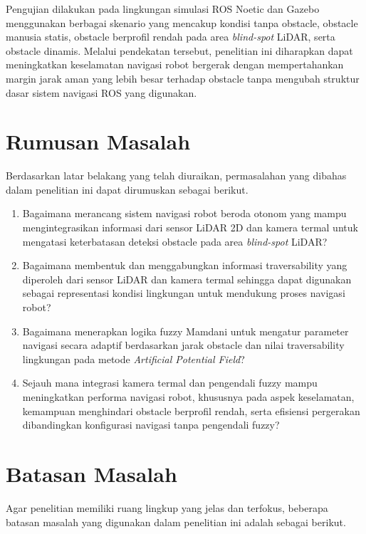 Pengujian dilakukan pada lingkungan simulasi ROS Noetic dan Gazebo menggunakan berbagai skenario yang mencakup kondisi tanpa obstacle, obstacle manusia statis, obstacle berprofil rendah pada area \textit{blind-spot} LiDAR, serta obstacle dinamis. Melalui pendekatan tersebut, penelitian ini diharapkan dapat meningkatkan keselamatan navigasi robot bergerak dengan mempertahankan margin jarak aman yang lebih besar terhadap obstacle tanpa mengubah struktur dasar sistem navigasi ROS yang digunakan.

\section{Rumusan Masalah}
\label{sec:Rumusan Masalah}

Berdasarkan latar belakang yang telah diuraikan, permasalahan yang dibahas dalam penelitian ini dapat dirumuskan sebagai berikut.

\begin{enumerate}
\item Bagaimana merancang sistem navigasi robot beroda otonom yang mampu mengintegrasikan informasi dari sensor LiDAR 2D dan kamera termal untuk mengatasi keterbatasan deteksi obstacle pada area \textit{blind-spot} LiDAR?
\item Bagaimana membentuk dan menggabungkan informasi traversability yang diperoleh dari sensor LiDAR dan kamera termal sehingga dapat digunakan sebagai representasi kondisi lingkungan untuk mendukung proses navigasi robot?
\item Bagaimana menerapkan logika fuzzy Mamdani untuk mengatur parameter navigasi secara adaptif berdasarkan jarak obstacle dan nilai traversability lingkungan pada metode \textit{Artificial Potential Field}?
\item Sejauh mana integrasi kamera termal dan pengendali fuzzy mampu meningkatkan performa navigasi robot, khususnya pada aspek keselamatan, kemampuan menghindari obstacle berprofil rendah, serta efisiensi pergerakan dibandingkan konfigurasi navigasi tanpa pengendali fuzzy?
\end{enumerate}


\section{Batasan Masalah}
\label{sec:batasanmasalah}

Agar penelitian memiliki ruang lingkup yang jelas dan terfokus, beberapa batasan masalah yang digunakan dalam penelitian ini adalah sebagai berikut.

